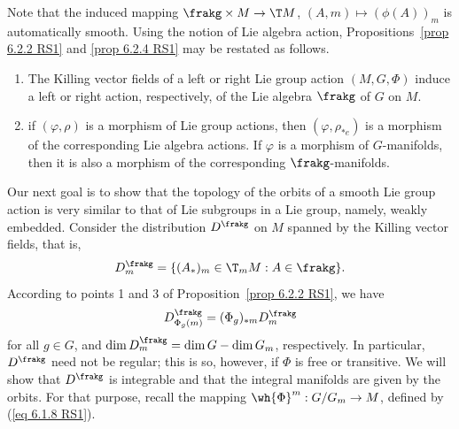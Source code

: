 Note that the induced mapping $\frakg\times M\to \T M$, $(A,m)\mapsto (\phi(A))_m$ is automatically smooth. Using the notion of Lie algebra action, Propositions~\ref{prop 6.2.2 RS1} and \ref{prop 6.2.4 RS1} may be restated as follows.

\begin{cor}[{{\cite[Cor.~6.2.7]{RS1}}}]
    \begin{enumerate}
        \item The Killing vector fields of a left or right Lie group action $(M,G,\Phi)$ induce a left or right action, respectively, of the Lie algebra $\frakg$ of $G$ on $M$.
        \item if $(\varphi,\rho)$ is a morphism of Lie group actions, then $(\varphi,\rho_{\ast e})$ is a morphism of the corresponding Lie algebra actions. If $\varphi$ is a morphism of $G$-manifolds, then it is also a morphism of the corresponding $\frakg$-manifolds.
    \end{enumerate}
\end{cor}

Our next goal is to show that the topology of the orbits of a smooth Lie group action is very similar to that of Lie subgroups in a Lie group, namely, weakly embedded. Consider the distribution $D^\frakg$ on $M$ spanned by the Killing vector fields, that is,
\[D^\frakg_m=\{(A_\ast)_m\in \T_m M:A\in \frakg\}.\]
According to points 1 and 3 of Proposition~\ref{prop 6.2.2 RS1}, we have
\[D^\frakg_{\Phi_g(m)}=(\Phi_g)_{\ast m}D^\frakg_m\label{eq 6.2.4 RS1}\]
for all $g\in G$, and $\dim D_m^\frakg=\dim G-\dim G_m$, respectively. In particular, $D^\frakg$ need not be regular; this is so, however, if $\Phi$ is free or transitive. We will show that $D^\frakg$ is integrable and that the integral manifolds are given by the orbits. For that purpose, recall the mapping $\wh{\Phi}^m:G\slash G_m\to M$, defined by (\ref{eq 6.1.8 RS1}).

